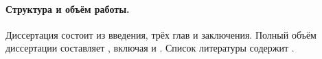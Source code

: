 \paragraph{Структура и объём работы.}
%
%
Диссертация состоит из введения, трёх глав и заключения.
Полный объём диссертации составляет , включая  и .
Список литературы содержит .
